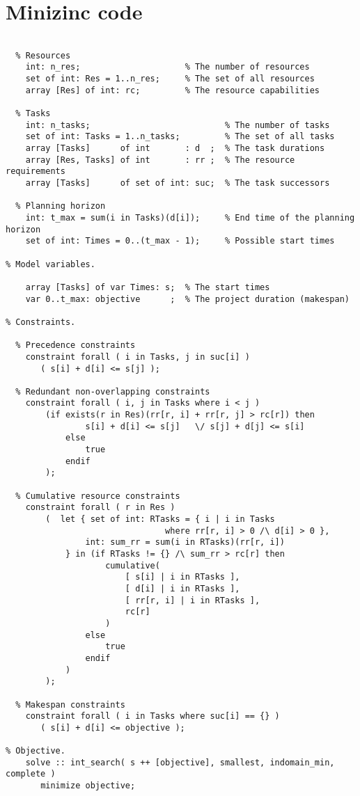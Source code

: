 \onecolumn
\section{Minizinc code}\label{lst:minizinc-rcpsp}
\begin{lstlisting}[caption={Minizic Code for the RSPCP}]
% Model parameters.

  % Resources
    int: n_res;                     % The number of resources
    set of int: Res = 1..n_res;     % The set of all resources
    array [Res] of int: rc;         % The resource capabilities

  % Tasks
    int: n_tasks;                           % The number of tasks
    set of int: Tasks = 1..n_tasks;         % The set of all tasks
    array [Tasks]      of int       : d  ;  % The task durations
    array [Res, Tasks] of int       : rr ;  % The resource requirements
    array [Tasks]      of set of int: suc;  % The task successors

  % Planning horizon
    int: t_max = sum(i in Tasks)(d[i]);     % End time of the planning horizon
    set of int: Times = 0..(t_max - 1);     % Possible start times

% Model variables.

    array [Tasks] of var Times: s;  % The start times
    var 0..t_max: objective      ;  % The project duration (makespan)

% Constraints.

  % Precedence constraints
    constraint forall ( i in Tasks, j in suc[i] )
       ( s[i] + d[i] <= s[j] );

  % Redundant non-overlapping constraints
    constraint forall ( i, j in Tasks where i < j )
        (if exists(r in Res)(rr[r, i] + rr[r, j] > rc[r]) then
                s[i] + d[i] <= s[j]   \/ s[j] + d[j] <= s[i]
            else
                true
            endif
        );

  % Cumulative resource constraints
    constraint forall ( r in Res )
        (  let { set of int: RTasks = { i | i in Tasks
                                where rr[r, i] > 0 /\ d[i] > 0 },
                int: sum_rr = sum(i in RTasks)(rr[r, i])
            } in (if RTasks != {} /\ sum_rr > rc[r] then
                    cumulative(
                        [ s[i] | i in RTasks ],
                        [ d[i] | i in RTasks ],
                        [ rr[r, i] | i in RTasks ],
                        rc[r]
                    )
                else
                    true
                endif
            )
        );

  % Makespan constraints
    constraint forall ( i in Tasks where suc[i] == {} )
       ( s[i] + d[i] <= objective );

% Objective.
    solve :: int_search( s ++ [objective], smallest, indomain_min, complete )
       minimize objective;
\end{lstlisting}

